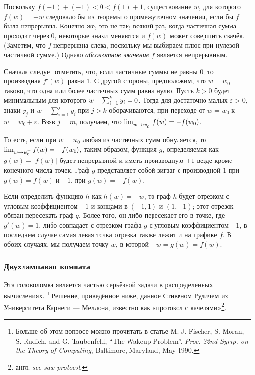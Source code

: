 Поскольку  $f(-1)+(-1)<0 <f(1)+ 1$, существование $w$, для которого $f(w)=-w$ следовало бы из теоремы о промежуточном значении, если бы $f$ была непрерывна.
Конечно же, это не так; всякий раз, когда частичная сумма проходит через 0, некоторые знаки меняются и $f(w)$ может совершить скачёк.
(Заметим, что $f$ непрерывна слева, поскольку мы выбираем плюс при нулевой частичной сумме.)
Однако \emph{абсолютное значение} $f$ является непрерывным.

Сначала следует отметить, что, если частичные суммы не равны $0$, то производная $f'(w)$ равна 1.
С другой стороны, предположим, что $w=w_0$ таково, что одна или более частичных сумм равна нулю.
Пусть $k > 0$ будет минимальным для которого $w+\sum_{i=1}^{k}y_i\z=0$.
Тогда для достаточно малых $\varepsilon>0$,
знаки $y_j$ и $w+\sum_{i=1}^{j}y_i$ при $j>k$ оборачиваются, при переходе от $w=w_0$ к $w=w_0+\varepsilon$.
Взяв $j = m$, получаем, что $\lim_{w\to w_0^+}f(w)\z=-f(w_0)$.

То есть, если при $w=w_0$ любая из частичных сумм обнуляется, то $\lim_{w\to w_0^+}f(w)\z=-f(w_0)$, таким образом, функция $g$, определяемая как $g(w) =|f(w)|$ будет непрерывной и иметь производную $\pm1$ везде кроме конечного числа точек.
Граф $g$ представляет собой зигзаг с производной $1$ при $g(w)=f(w)$ и $-1$, при $g(w)=-f(w)$.

Если определить функцию $h$ как $h (w) = -w$, то граф $h$ будет отрезком с угловым коэффициентом $-1$ и концами в $(-1,1)$ и $(1,-1)$;
этот отрезок обязан пересекать граф $g$.
Более того, он либо пересекает его в точке, где $g'(w) = 1$, либо совпадает с отрезком графа $g$ с угловым коэффициентом $-1$, в последнем случае самая левая точка отрезка также лежит и на графике $f$.
В обоих случаях, мы получаем точку $w$, в которой $-w = g (w) = f (w)$. \heart

\subsubsection*{Двухлампавая комната}

Эта головоломка является частью серьёзной задачи в распределенных вычислениях.%
\footnote{Больше об этом вопросе можно прочитать в статье M. J. Fischer, S. Moran, S. Rudich, and G. Taubenfeld, ``The Wakeup Problem''. \emph{Proc. 22nd Symp. on the Theory of Computing}, Baltimore, Maryland, May 1990.}
Решение, приведённое ниже, данное Стивеном Рудичем из Университета Карнеги --- Меллона, известно как «протокол с качелями»\footnote{англ. \emph{see-saw protocol}.}.

